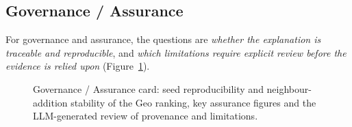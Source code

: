 \clearpage

\subsection{Governance / Assurance}
For governance and assurance, the questions are \emph{whether the explanation is traceable and
reproducible}, and \emph{which limitations require explicit review before the evidence is
relied upon} (Figure~\ref{fig:stakeholder-governance}).\par\medskip
\def\cardtilegroup{governancetiles}
\measurecard

\begin{figure}[H]
\def\cardtilewidth{0.49\linewidth}
\def\cardtiles{\noindent\cardTileA\hfill\cardTileB\par}
\def\cardcontent{\begin{tcolorbox}[stakecard]
\setlength{\parskip}{0pt}\raggedright%
{\color{cardMuted}Provenance, reproducibility and the limitations to review before reliance}\par\vspace{4pt}
\cardpair{01 \textperiodcentered{} Reproducibility across seeds}{Chapter6/figs/dashboard_governance_short_hull_1.png}
  {02 \textperiodcentered{} Stability under neighbour additions}{Chapter6/figs/dashboard_governance_short_hull_2.png}
  {Provenance and reproducibility}{\cardSecA}
  {Limitations requiring review}{\cardSecB}
\vspace{5pt}
\cardtiles
\cardfoot{\cardFooter{} Panels are the dashboard's governance view.}
\end{tcolorbox}}
\caption{Governance / Assurance card: seed reproducibility and neighbour-addition stability of
the Geo ranking, key assurance figures and the LLM-generated review of provenance and
limitations.}
\label{fig:stakeholder-governance}
\end{figure}
